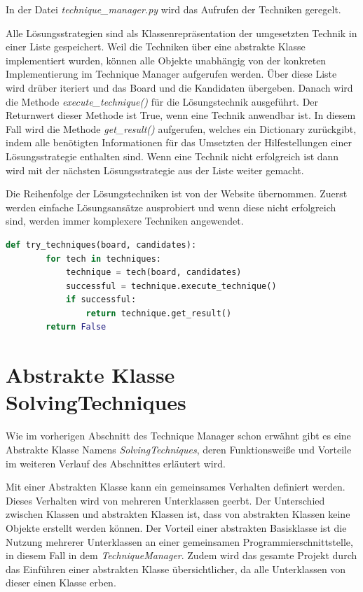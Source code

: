 In der Datei \textit{technique\_manager.py} wird das Aufrufen der Techniken geregelt. 

Alle Lösungsstrategien sind als Klassenrepräsentation der umgesetzten Technik in einer Liste gespeichert. Weil die Techniken über eine abstrakte Klasse implementiert wurden, können alle Objekte unabhängig von der konkreten Implementierung im Technique Manager aufgerufen werden. Über diese Liste wird drüber iteriert und das Board und die Kandidaten übergeben. Danach wird die Methode \textit{execute\_technique()} für die Lösungstechnik ausgeführt. Der Returnwert dieser Methode ist True, wenn eine Technik anwendbar ist. In diesem Fall wird die Methode \textit{get\_result()} aufgerufen, welches ein Dictionary zurückgibt, indem alle benötigten Informationen für das Umsetzten der Hilfestellungen einer Lösungsstrategie enthalten sind.
Wenn eine Technik nicht erfolgreich ist dann wird mit der nächsten Lösungsstrategie aus der Liste weiter gemacht. 

Die Reihenfolge der Lösungstechniken ist von der Website \cite{martin} übernommen. Zuerst werden einfache Lösungsansätze ausprobiert und wenn diese nicht erfolgreich sind, werden immer komplexere Techniken angewendet. 

\begin{lstlisting}[language=Python, caption={Funktion um eine anwendbare Lösungstechnik zu finden}, label={lst:try}]
	def try_techniques(board, candidates):
		for tech in techniques:
			technique = tech(board, candidates)
			successful = technique.execute_technique()
			if successful:
				return technique.get_result()
		return False
\end{lstlisting}

\section{Abstrakte Klasse SolvingTechniques}

Wie im vorherigen Abschnitt des Technique Manager schon erwähnt gibt es eine Abstrakte Klasse Namens \textit{SolvingTechniques}, deren Funktionsweiße und Vorteile im weiteren Verlauf des Abschnittes erläutert wird. 

Mit einer Abstrakten Klasse kann ein gemeinsames Verhalten definiert werden. Dieses Verhalten wird von mehreren Unterklassen geerbt. Der Unterschied zwischen Klassen und abstrakten Klassen ist, dass von abstrakten Klassen keine Objekte erstellt werden können. Der Vorteil einer abstrakten Basisklasse ist die Nutzung mehrerer Unterklassen an einer gemeinsamen Programmierschnittstelle, in diesem Fall in dem \textit{TechniqueManager}. Zudem wird das gesamte Projekt durch das Einführen einer abstrakten Klasse übersichtlicher, da alle Unterklassen von dieser einen Klasse erben.

